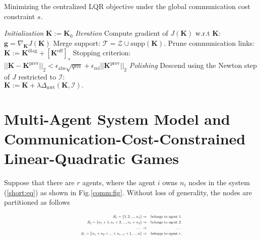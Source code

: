 \documentclass[12pt, draftclsnofoot,onecolumn]{IEEEtran}
\newcommand{\eqratio}{0.42}
\newcommand{\eqratio}{0.55}
\begin{document}
\begin{algorithm}[!t]
	 \caption{Minimizing the centralized LQR objective under the global communication cost constraint $s$.}
	 \label{cent:alg}
	\begin{algorithmic}
	 {\it Initialization} 
	\State ${\boldsymbol K} := {\boldsymbol K}_{0}$
	 {\it Iteration} 
	 {Compute gradient of $J(\boldsymbol K)$ w.r.t ${\boldsymbol K}$: ${\boldsymbol g} = \nabla_{{\boldsymbol K}}J({\boldsymbol K})$}
	 {Merge support: $\mathcal{T} = \mathcal{Z} \cup \mathrm{supp}({\boldsymbol K}).$}
	 {Prune communication links: ${\boldsymbol K}:={\boldsymbol K}^{\mathrm{diag}}+[{\boldsymbol K}^{\mathrm{off}}]_{s}$}
     {Stopping criterion: \\$||{\boldsymbol K}-{\boldsymbol K}^{\mathrm{prev}}||_2 < \epsilon_{\mathrm{abs}}\sqrt{qm}+\epsilon_{\mathrm{rel}}||{\boldsymbol K}^{\mathrm{prev}}||_2$}
    \EndWhile
	 {\it Polishing}
\State Descend using the Newton step of $J$ restricted to ${\mathcal I}$: \\${\boldsymbol K} := {\boldsymbol K} + \lambda \Delta_{\mathrm{nwt}}({\boldsymbol K},\mathcal{I}).$
	\EndWhile
	 \end{algorithmic}
\end{algorithm}


\section{Multi-Agent System Model and Communication-Cost-Constrained Linear-Quadratic Games}
\label{densegame:sec}
Suppose that there are $r$ agents, where the agent $i$ owns $n_i$ nodes in the system (\ref{short:eq}) as shown in Fig.\ref{comm:fig}. Without loss of generality, the nodes are partitioned as follows

\begin{gather}
\resizebox{\eqratio\textwidth}{!}{
$\begin{aligned}
\mathcal S_1 = \{1,2,...,n_1\} & \Rightarrow &\mbox{belongs to agent $1$.}\\
\mathcal S_2 = \{n_1+1,n_1+2,...,n_1+n_2\} & \Rightarrow &\mbox{belongs to agent $2$.}\\
\hdots~ & \Rightarrow & \hdots~ \\
\mathcal S_r = \{n_1+n_2+...+n_{r-1}+1,...,n\} & \Rightarrow &\mbox{belongs to agent $r$.}
\label{partition:eq}
\end{aligned}$}
\end{gather} 
\end{document}
